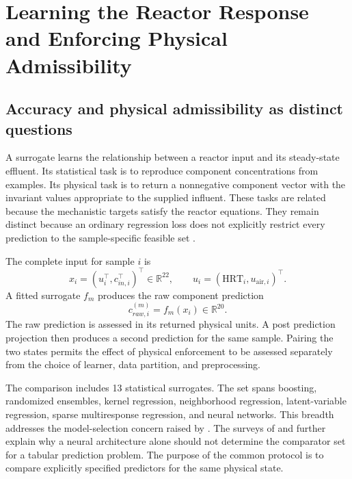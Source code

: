 \chapter{Learning the Reactor Response and Enforcing Physical Admissibility}
\label{ch:projection}

\section{Accuracy and physical admissibility as distinct questions}

A surrogate learns the relationship between a reactor input and its steady-state effluent. Its statistical task is to reproduce component concentrations from examples. Its physical task is to return a nonnegative component vector with the invariant values appropriate to the supplied influent. These tasks are related because the mechanistic targets satisfy the reactor equations. They remain distinct because an ordinary regression loss does not explicitly restrict every prediction to the sample-specific feasible set \citep{Kashinath2021,Hansen2024}.

The complete input for sample $i$ is
\begin{equation}
x_i=(u_i^\top,c_{in,i}^\top)^\top\in\mathbb{R}^{22},\qquad
u_i=(\mathrm{HRT}_i,u_{\mathrm{air},i})^\top.
\label{eq:surrogate_input_vector}
\end{equation}
A fitted surrogate $f_m$ produces the raw component prediction
\begin{equation}
c_{raw,i}^{(m)}=f_m(x_i)\in\mathbb{R}^{20}.
\label{eq:surrogate_raw_state}
\end{equation}
The raw prediction is assessed in its returned physical units. A post prediction projection then produces a second prediction for the same sample. Pairing the two states permits the effect of physical enforcement to be assessed separately from the choice of learner, data partition, and preprocessing.

The comparison includes 13 statistical surrogates. The set spans boosting, randomized ensembles, kernel regression, neighborhood regression, latent-variable regression, sparse multiresponse regression, and neural networks. This breadth addresses the model-selection concern raised by \citet{BhosekarIerapetritou2018}. The surveys of \citet{Borisov2024} and \citet{ShwartzZiv2022} further explain why a neural architecture alone should not determine the comparator set for a tabular prediction problem. The purpose of the common protocol is to compare explicitly specified predictors for the same physical state.

